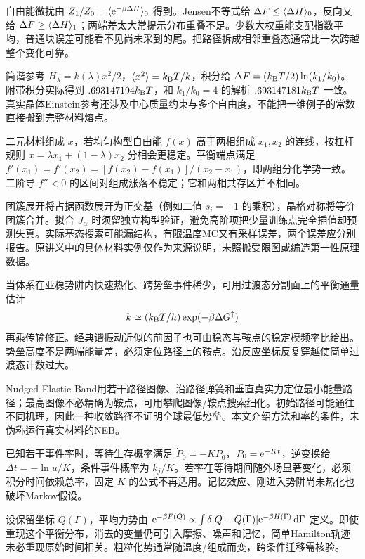 自由能微扰由 $Z_1/Z_0=\langle \mathrm e^{-\beta\Delta H}\rangle_0$ 得到。Jensen不等式给 $\Delta F\le\langle \Delta H\rangle_0$，反向又给 $\Delta F\ge\langle \Delta H\rangle_1$；两端差太大常提示分布重叠不足。少数大权重能支配指数平均，普通块误差可能看不见尚未采到的尾。把路径拆成相邻重叠态通常比一次跨越整个变化可靠。

简谐参考 $H_\lambda=k(\lambda)x^2/2$，$\langle x^2\rangle=k_{\mathrm B} T/k$，积分给 $\Delta F=(k_{\mathrm B} T/2)\ln(k_1/k_0)$。附带积分实际得到 $.693147194k_{\mathrm B} T$，和 $k_1/k_0=4$ 的解析 $.693147181k_{\mathrm B} T$ 一致。真实晶体Einstein参考还涉及中心质量约束与多个自由度，不能把一维例子的常数直接搬到完整材料熔点。

二元材料组成 $x$，若均匀构型自由能 $f(x)$ 高于两相组成 $x_1,x_2$ 的连线，按杠杆规则 $x=\lambda x_1+(1-\lambda)x_2$ 分相会更稳定。平衡端点满足 $f'(x_1)=f'(x_2)=[f(x_2)-f(x_1)]/(x_2-x_1)$，即两组分化学势一致。二阶导 $f''<0$ 的区间对组成涨落不稳定；它和两相共存区并不相同。

团簇展开将占据函数展开为正交基（例如二值 $s_i=\pm1$ 的乘积），晶格对称将等价团簇合并。拟合 $J_\alpha$ 时须留独立构型验证，避免高阶项把少量训练点完全插值却预测失真。实际基态搜索可能漏结构，有限温度MC又有采样误差，两个误差应分别报告。原讲义中的具体材料实例仅作为来源说明，未照搬受限图或编造第一性原理数据。

当体系在亚稳势阱内快速热化、跨势垒事件稀少，可用过渡态分割面上的平衡通量估计
\[k\simeq(k_{\mathrm B} T/h)\exp(-\beta\Delta G^\ddagger)\]
再乘传输修正。经典谐振动近似的前因子也可由稳态与鞍点的稳定模频率比给出。势垒高度不是两端能量差，必须定位路径上的鞍点。沿反应坐标反复穿越使简单过渡态计数过大。

Nudged Elastic Band用若干路径图像、沿路径弹簧和垂直真实力定位最小能量路径；最高图像不必精确为鞍点，可用攀爬图像/鞍点搜索细化。初始路径可能通往不同机理，因此一种收敛路径不证明全球最低势垒。本文介绍方法和率的条件，未伪称运行真实材料的NEB。

已知若干事件率时，等待生存概率满足 $\dot P_0=-KP_0$，$P_0=\mathrm e^{-Kt}$，逆变换给 $\Delta t=-\ln u/K$，条件事件概率为 $k_j/K$。若率在等待期间随外场显著变化，必须积分时间依赖总率，固定 $K$ 的公式不再适用。记忆效应、刚进入势阱尚未热化也破坏Markov假设。

设保留坐标 $Q(\Gamma)$，平均力势由 $\mathrm e^{-\beta F(Q)}\propto\int\delta[Q-Q(\Gamma)]\mathrm e^{-\beta H(\Gamma)}\,\mathrm d\Gamma$ 定义。即使重现这个平衡分布，消去的变量仍可引入摩擦、噪声和记忆，简单Hamilton轨迹未必重现原始时间相关。粗粒化势通常随温度/组成而变，跨条件迁移需核验。

